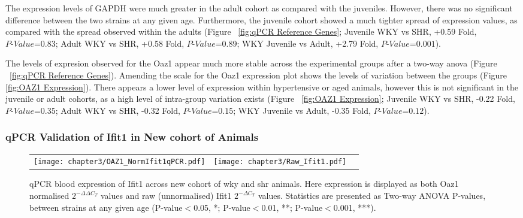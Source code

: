 The expression levels of GAPDH were much greater in the adult cohort as compared with the juveniles. However, there was no significant difference between the two strains at any given age. Furthermore, the juvenile cohort showed a much tighter spread of expression values, as compared with the spread observed within the adults (Figure ~\ref{fig:qPCR Reference Genes}; Juvenile WKY vs SHR, +0.59 Fold, $\textit{P-Value=0.83}$; Adult WKY vs SHR, +0.58 Fold, $\textit{P-Value=0.89}$; WKY Juvenile vs Adult, +2.79 Fold, $\textit{P-Value=0.001}$). 

The levels of expresion observed for the Oaz1 appear much more stable across the experimental groups after a two-way \acrshort{anova} (Figure ~\ref{fig:qPCR Reference Genes}). Amending the scale for the Oaz1 expression plot shows the levels of variation between the groups (Figure \ref{fig:OAZ1 Expression}). There appears a lower level of expression within hypertensive or aged animals, however this is not significant in the juvenile or adult cohorts, as a high level of intra-group variation exists (Figure ~\ref{fig:OAZ1 Expression}; Juvenile WKY vs SHR, -0.22 Fold, $\textit{P-Value=0.35}$; Adult WKY vs SHR, -0.32 Fold, $\textit{P-Value=0.15}$; WKY Juvenile vs Adult, -0.35 Fold, $\textit{P-Value=0.12}$). 


\subsubsection{qPCR Validation of Ifit1 in New cohort of Animals} \label{qPCR Validation of Ifit1 in New cohort of Animals} 

\begin{figure*}[!hbtp]
\centering
\begin{tabular}{ccc}
  \texttt{[image: chapter3/OAZ1\_NormIfit1qPCR.pdf]} & \texttt{[image: chapter3/Raw\_Ifit1.pdf]} \\
\end{tabular}
\caption[qPCR blood expression of Ifit1 across new cohort of \acrfull{wky} and \acrfull{shr} animals]{qPCR blood expression of Ifit1 across new cohort of \acrfull{wky} and \acrfull{shr} animals. Here expression is displayed as both Oaz1 normalised $2^{-\Delta\Delta C_{T}}$ values and raw (unnormalised) Ifit1 $2^{-\Delta C_{T}}$ values. Statistics are presented as Two-way ANOVA P-values, between strains at any given age (P-value$<$0.05, *; P-value$<$0.01, **; P-value$<$0.001, ***).}
\label{fig:Ifit1 Expression in New Cohort of animals}
\end{figure*}



